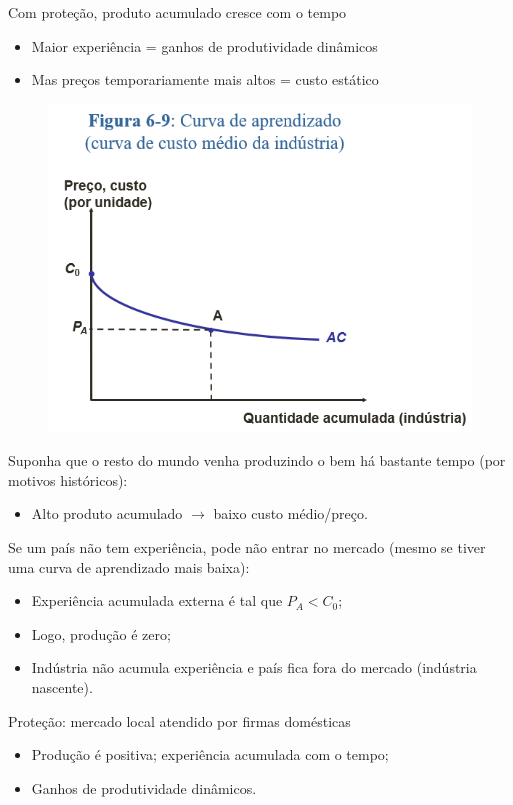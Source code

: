 \documentclass[a4paper,12pt]{article}[abntex2]
\begin{document}
Com proteção, produto acumulado cresce com o tempo  
\begin{itemize}
  \item Maior experiência = ganhos de produtividade dinâmicos
  \item Mas preços temporariamente mais altos = custo estático
\end{itemize}

\begin{figure}[H]
    \centering
    \includegraphics[width=0.7\linewidth]{Imagens/a19i2.png}
\end{figure}

Suponha que o resto do mundo venha produzindo o bem há bastante tempo (por motivos históricos):
\begin{itemize}
  \item Alto produto acumulado \(\to\) baixo custo médio/preço.
\end{itemize}

Se um país não tem experiência, pode não entrar no mercado (mesmo se tiver uma curva de aprendizado mais baixa):
\begin{itemize}
  \item Experiência acumulada externa é tal que \(P_A < C_0\);
  \item Logo, produção é zero;
  \item Indústria não acumula experiência e país fica fora do mercado (indústria nascente).
\end{itemize}

Proteção: mercado local atendido por firmas domésticas
\begin{itemize}
  \item Produção é positiva; experiência acumulada com o tempo;
  \item Ganhos de produtividade dinâmicos.
\end{itemize}
\end{document}
